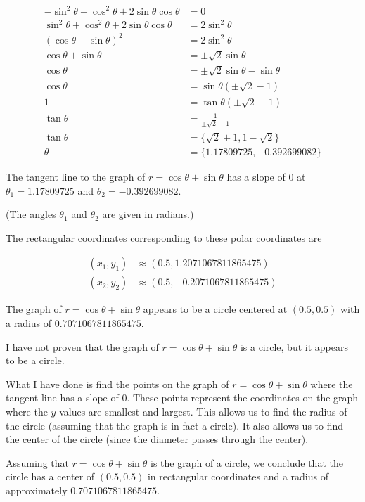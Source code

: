 \begin{align*}
-\sin^2 \theta + \cos^2 \theta + 2 \sin \theta \cos \theta &= 0 \\
\sin^2 \theta + \cos^2 \theta + 2 \sin \theta \cos \theta &= 2 \sin^2 \theta \\
\left( \cos \theta + \sin \theta \right)^2 &= 2 \sin^2 \theta \\
\cos \theta + \sin \theta &= \pm \sqrt 2 \sin \theta \\
\cos \theta &= \pm \sqrt 2 \sin \theta - \sin \theta \\
\cos \theta &= \sin \theta \left( \pm \sqrt 2 - 1 \right) \\
1 &= \tan \theta \left( \pm \sqrt 2 - 1 \right) \\
\tan \theta &= \frac{1}{\pm \sqrt 2 - 1} \\
\tan \theta &= \Bigg\{ \sqrt{2} + 1, 1 - \sqrt 2 \Bigg\} \\
\theta &= \Bigg\{ 1.17809725, -0.392699082 \Bigg\}
\end{align*}

The tangent line to the graph of $r = \cos \theta + \sin \theta$ has a slope of $0$ at $\theta_1 = 1.17809725$ and $\theta_2 = -0.392699082$.

(The angles $\theta_1$ and $\theta_2$ are given in radians.)

The rectangular coordinates corresponding to these polar coordinates are

\begin{align*}
(x_1, y_1) &\approx (0.5, 1.2071067811865475) \\
(x_2, y_2) &\approx (0.5, -0.2071067811865475)
\end{align*}

The graph of $r = \cos \theta + \sin \theta$ appears to be a circle centered at $(0.5, 0.5)$ with a radius of $0.7071067811865475$.

I have not proven that the graph of $r = \cos \theta + \sin \theta$ is a circle, but it appears to be a circle.

What I have done is find the points on the graph of $r = \cos \theta + \sin \theta$ where the tangent line has a slope of 0. These points represent the coordinates on the graph where the $y$-values are smallest and largest. This allows us to find the radius of the circle (assuming that the graph is in fact a circle). It also allows us to find the center of the circle (since the diameter passes through the center).

Assuming that $r = \cos \theta + \sin \theta$ is the graph of a circle, we conclude that the circle has a center of $(0.5, 0.5)$ in rectangular coordinates and a radius of approximately $0.7071067811865475$.
